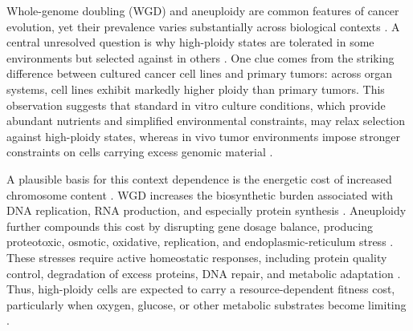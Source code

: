 \documentclass[11pt]{article}
\begin{document}
Whole-genome doubling (WGD) and aneuploidy are common features of cancer evolution, yet their prevalence varies substantially across biological contexts \cite{bielski_genome_2018,davoli_tumor_2017,salehi_clonal_2021}. A central unresolved question is why high-ploidy states are tolerated in some environments but selected against in others \cite{nowicka_interactions_2025,beck_energetics_2025}. One clue comes from the striking difference between cultured cancer cell lines and primary tumors: across organ systems, cell lines exhibit markedly higher ploidy than primary tumors. This observation suggests that standard in vitro culture conditions, which provide abundant nutrients and simplified environmental constraints, may relax selection against high-ploidy states, whereas in vivo tumor environments impose stronger constraints on cells carrying excess genomic material \cite{nowicka_interactions_2025,beck_energetics_2025}.

A plausible basis for this context dependence is the energetic cost of increased chromosome content \cite{donovan_hyperdiploid_2014,nowicka_interactions_2025,beck_energetics_2025}. WGD increases the biosynthetic burden associated with DNA replication, RNA production, and especially protein synthesis \cite{donovan_hyperdiploid_2014,nowicka_interactions_2025,beck_energetics_2025}. Aneuploidy further compounds this cost by disrupting gene dosage balance, producing proteotoxic, osmotic, oxidative, replication, and endoplasmic-reticulum stress \cite{santaguida_chromosome_2017,sheltzer_single-chromosome_2017,kuznetsova_chromosomal_2015}. These stresses require active homeostatic responses, including protein quality control, degradation of excess proteins, DNA repair, and metabolic adaptation \cite{santaguida_chromosome_2017,sheltzer_single-chromosome_2017,kuznetsova_chromosomal_2015,beck_energetics_2025}. Thus, high-ploidy cells are expected to carry a resource-dependent fitness cost, particularly when oxygen, glucose, or other metabolic substrates become limiting \cite{nowicka_interactions_2025,beck_energetics_2025}.
\end{document}
